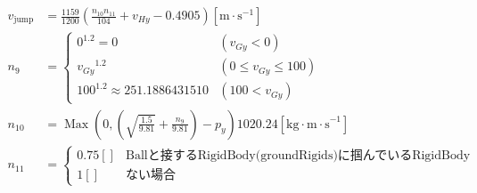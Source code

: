 \documentclass[fleqn]{jlreq}
\begin{document}
\begin{align*}
    v_{\mathrm{jump}} &= \frac{1159}{1200}\left(\frac{n_{10}n_{11}}{104} + v_{Hy} - 0.4905\right)[\mathrm{m\cdot s}^{-1}]\\
    n_{9} &= \begin{cases}
        0^{1.2}=0 & \left(v_{Gy} < 0\right) \\
        {v_{Gy}}^{1.2} & \left(0 \leq v_{Gy} \leq 100\right) \\
        100^{1.2} \approx 251.1886431510 & \left(100 < v_{Gy}\right) 
    \end{cases} \\
    n_{10} &= \operatorname{Max} \left(0, \left(\sqrt{\frac{1.5}{9.81}} + \frac{n_{9}}{9.81}\right) - p_{y}\right)1020.24[\mathrm{kg\cdot m\cdot s}^{-1}]\\
    n_{11} &= \begin{cases}
        0.75[] & \text{Ballと接するRigidBody(groundRigids)に掴んでいるRigidBodyがある場合}\\
        1[] & \text{ない場合}
    \end{cases}\\
\end{align*}
\end{document}
